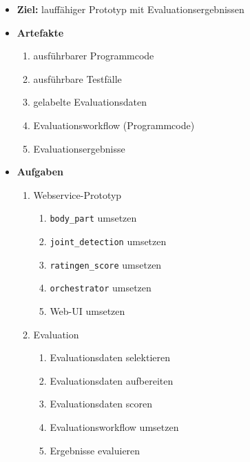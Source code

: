 \begin{itemize}
    \item \textbf{Ziel:} lauffähiger Prototyp mit Evaluationsergebnissen
    \item \textbf{Artefakte}
        \begin{enumerate}
            \item ausführbarer Programmcode
            \item ausführbare Testfälle
            \item gelabelte Evaluationsdaten
            \item Evaluationsworkflow (Programmcode)
            \item Evaluationsergebnisse
        \end{enumerate}
    \item \textbf{Aufgaben}
        \begin{enumerate}
            \item Webservice-Prototyp
                \begin{multicols}{2}
                    \begin{enumerate}
                        \item \texttt{body\_part} umsetzen
                        \item \texttt{joint\_detection} umsetzen
                        \item \texttt{ratingen\_score} umsetzen
                        \item \texttt{orchestrator} umsetzen
                        \item Web-UI umsetzen
                    \end{enumerate}
                \end{multicols}
            \item Evaluation
                \begin{multicols}{2}
                    \begin{enumerate}
                        \item Evaluationsdaten selektieren
                        \item Evaluationsdaten aufbereiten
                        \item Evaluationsdaten scoren
                        \item Evaluationsworkflow umsetzen
                        \item Ergebnisse evaluieren
                    \end{enumerate}
                \end{multicols}

\end{enumerate}
\end{itemize}
